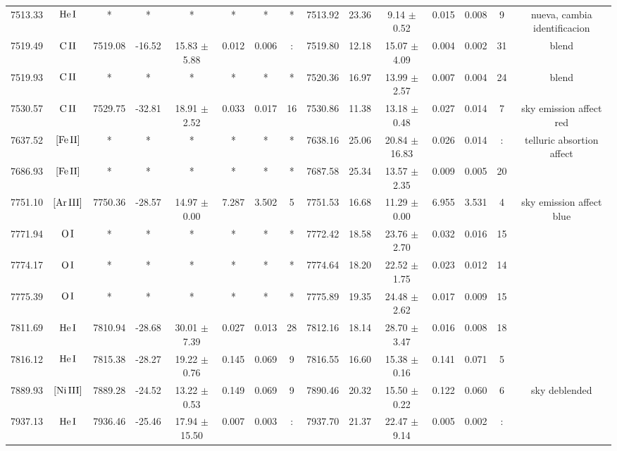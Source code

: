 \documentclass{article}
\begin{document}
\begin{table*}
\begin{adjustbox}{width=\textwidth}
\begin{tabular}{ccccccccccccccc}
7513.33 & $\mbox{He}\thinspace \mbox{I}$ & * & * & * & * & * & * & 7513.92 & 23.36 & 9.14 $\pm$ 0.52 & 0.015 & 0.008 & 9 &  nueva, cambia identificacion \\
7519.49 & $\mbox{C}\thinspace \mbox{II}$ & 7519.08 & -16.52 & 15.83 $\pm$ 5.88 & 0.012 & 0.006 & : & 7519.80 & 12.18 & 15.07 $\pm$ 4.09 & 0.004 & 0.002 & 31 &  blend \\
7519.93 & $\mbox{C}\thinspace \mbox{II}$ & * & * & * & * & * & * & 7520.36 & 16.97 & 13.99 $\pm$ 2.57 & 0.007 & 0.004 & 24 &  blend \\
7530.57 & $\mbox{C}\thinspace \mbox{II}$ & 7529.75 & -32.81 & 18.91 $\pm$ 2.52 & 0.033 & 0.017 & 16 & 7530.86 & 11.38 & 13.18 $\pm$ 0.48 & 0.027 & 0.014 & 7 &  sky emission affect red \\
7637.52 & $\mbox{[Fe}\thinspace \mbox{II]}$ & * & * & * & * & * & * & 7638.16 & 25.06 & 20.84 $\pm$ 16.83 & 0.026 & 0.014 & : &  telluric absortion affect \\
7686.93 & $\mbox{[Fe}\thinspace \mbox{II]}$ & * & * & * & * & * & * & 7687.58 & 25.34 & 13.57 $\pm$ 2.35 & 0.009 & 0.005 & 20 &  \\
7751.10 & $\mbox{[Ar}\thinspace \mbox{III]}$ & 7750.36 & -28.57 & 14.97 $\pm$ 0.00 & 7.287 & 3.502 & 5 & 7751.53 & 16.68 & 11.29 $\pm$ 0.00 & 6.955 & 3.531 & 4 &  sky emission affect blue \\
7771.94 & $\mbox{O}\thinspace \mbox{I}$ & * & * & * & * & * & * & 7772.42 & 18.58 & 23.76 $\pm$ 2.70 & 0.032 & 0.016 & 15 &   \\
7774.17 & $\mbox{O}\thinspace \mbox{I}$ & * & * & * & * & * & * & 7774.64 & 18.20 & 22.52 $\pm$ 1.75 & 0.023 & 0.012 & 14 &   \\
7775.39 & $\mbox{O}\thinspace \mbox{I}$ & * & * & * & * & * & * & 7775.89 & 19.35 & 24.48 $\pm$ 2.62 & 0.017 & 0.009 & 15 &   \\
7811.69 & $\mbox{He}\thinspace \mbox{I}$ & 7810.94 & -28.68 & 30.01 $\pm$ 7.39 & 0.027 & 0.013 & 28 & 7812.16 & 18.14 & 28.70 $\pm$ 3.47 & 0.016 & 0.008 & 18 &  \\
7816.12 & $\mbox{He}\thinspace \mbox{I}$ & 7815.38 & -28.27 & 19.22 $\pm$ 0.76 & 0.145 & 0.069 & 9 & 7816.55 & 16.60 & 15.38 $\pm$ 0.16 & 0.141 & 0.071 & 5 &  \\
7889.93 & $\mbox{[Ni}\thinspace \mbox{III]}$ & 7889.28 & -24.52 & 13.22 $\pm$ 0.53 & 0.149 & 0.069 & 9 & 7890.46 & 20.32 & 15.50 $\pm$ 0.22 & 0.122 & 0.060 & 6 &  sky deblended \\
7937.13 & $\mbox{He}\thinspace \mbox{I}$ & 7936.46 & -25.46 & 17.94 $\pm$ 15.50 & 0.007 & 0.003 & : & 7937.70 & 21.37 & 22.47 $\pm$ 9.14 & 0.005 & 0.002 & : &  \\

\end{tabular}
\end{adjustbox}
\end{table*}
\end{document}
